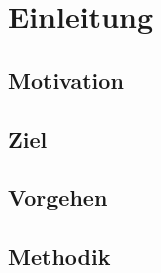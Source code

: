 \section{Einleitung}\label{sec:introduction}

\subsection{Motivation}\label{sec:introduction:motivation}


\subsection{Ziel}\label{sec:introduction:ziel}


\subsection{Vorgehen}\label{sec:introduction:vorgehen}


\subsection{Methodik}\label{sec:introduction:methodik}

